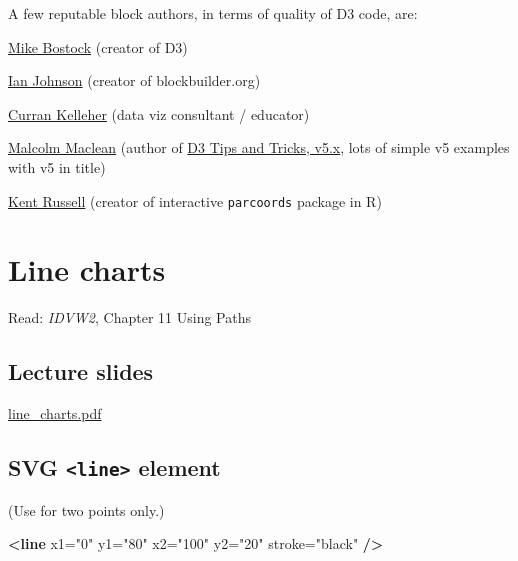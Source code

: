 \documentclass[
  openany]{book}
\newenvironment{Shaded}{\begin{snugshade}}{\end{snugshade}}
\newcommand{\KeywordTok}[1]{\textcolor[rgb]{0.13,0.29,0.53}{\textbf{#1}}}
\newcommand{\OtherTok}[1]{\textcolor[rgb]{0.56,0.35,0.01}{#1}}
\newcommand{\StringTok}[1]{\textcolor[rgb]{0.31,0.60,0.02}{#1}}
\begin{document}
A few reputable block authors, in terms of quality of D3 code, are:

\href{https://bl.ocks.org/mbostock}{Mike Bostock} (creator of D3)

\href{https://bl.ocks.org/enjalot}{Ian Johnson} (creator of blockbuilder.org)

\href{https://bl.ocks.org/curran}{Curran Kelleher} (data viz consultant / educator)

\href{https://bl.ocks.org/d3noob}{Malcolm Maclean} (author of \href{https://leanpub.com/d3-t-and-t-v5}{D3 Tips and Tricks, v5.x}, lots of simple v5 examples with v5 in title)

\href{https://bl.ocks.org/timelyportfolio}{Kent Russell} (creator of interactive \texttt{parcoords} package in R)

\hypertarget{line-charts}{%
\chapter{\texorpdfstring{Line charts }{Line charts }}\label{line-charts}}

Read: \emph{IDVW2}, Chapter 11 Using Paths

\hypertarget{lecture-slides-5}{%
\section{\texorpdfstring{Lecture slides }{Lecture slides }}\label{lecture-slides-5}}

\href{pdfs/line_charts.pdf}{line\_charts.pdf}

\hypertarget{svg-line-element}{%
\section{\texorpdfstring{SVG \texttt{\textless{}line\textgreater{}} element}{SVG \textless line\textgreater{} element}}\label{svg-line-element}}

(Use for two points only.)

\begin{Shaded}
\begin{Highlighting}[]
\KeywordTok{\textless{}line}\OtherTok{ x1=}\StringTok{"0"}\OtherTok{ y1=}\StringTok{"80"}\OtherTok{ x2=}\StringTok{"100"}\OtherTok{ y2=}\StringTok{"20"}\OtherTok{ stroke=}\StringTok{"black"} \KeywordTok{/\textgreater{}}
\end{Highlighting}
\end{Shaded}
\end{document}
